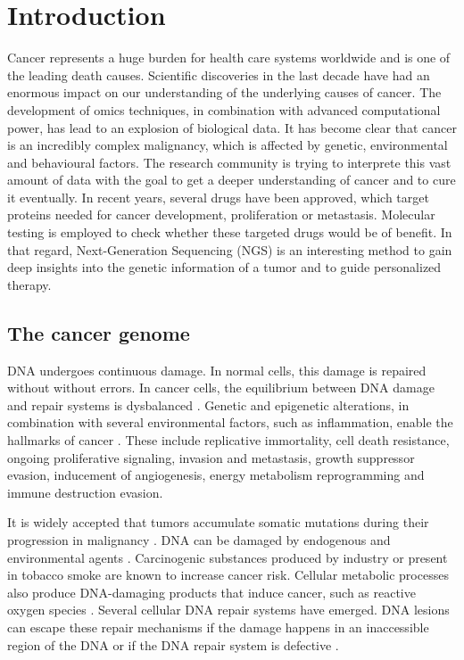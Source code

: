 \section{Introduction}

  Cancer represents a huge burden for health care systems worldwide and is one
  of the leading death causes. Scientific discoveries in the last decade have
  had an enormous impact on our understanding of the underlying causes of
  cancer. The development of omics techniques, in combination with advanced
  computational power, has lead to an explosion of biological data. It has
  become clear that cancer is an incredibly complex malignancy, which is
  affected by genetic, environmental and behavioural factors. The research
  community is trying to interprete this vast amount of data with the goal to
  get a deeper understanding of cancer and to cure it eventually. In recent
  years, several drugs have been approved, which target proteins needed for
  cancer development, proliferation or metastasis. Molecular testing is employed
  to check whether these targeted drugs would be of benefit. In that regard,
  Next-Generation Sequencing (NGS) is an interesting method to gain deep
  insights into the genetic information of a tumor and to guide personalized
  therapy.

  \subsection{The cancer genome}

    DNA undergoes continuous damage. In normal cells, this damage is repaired
    without without errors. In cancer cells, the equilibrium between DNA damage
    and repair systems is dysbalanced {\cite{dna_repair_epidemioloy}}. Genetic
    and epigenetic alterations, in combination with several environmental
    factors, such as inflammation, enable the hallmarks of cancer
    {\cite{cancer_hallmarks}}. These include replicative immortality, cell death
    resistance, ongoing proliferative signaling, invasion and metastasis, growth
    suppressor evasion, inducement of angiogenesis, energy metabolism
    reprogramming and immune destruction evasion.

    It is widely accepted that tumors accumulate somatic mutations during their
    progression in malignancy {\cite{accumulation_rates}}
    {\cite{mutations_counting}}. DNA can be damaged by endogenous and
    environmental agents {\cite{multiple_mutations}}. Carcinogenic substances
    produced by industry {\cite{occupational_exposure}} {\cite{rubber_industry}}
    or present in tobacco smoke {\cite{smoking_cancer}} are known to increase
    cancer risk. Cellular metabolic processes also produce DNA-damaging products
    that induce cancer, such as reactive oxygen species {\cite{ros_cancer}}
    {\cite{ros_cancer_other}}. Several cellular DNA repair systems have emerged.
    DNA lesions can escape these repair mechanisms if the damage happens in an
    inaccessible region of the DNA or if the DNA repair system is defective
    {\cite{dna_repair}}.

